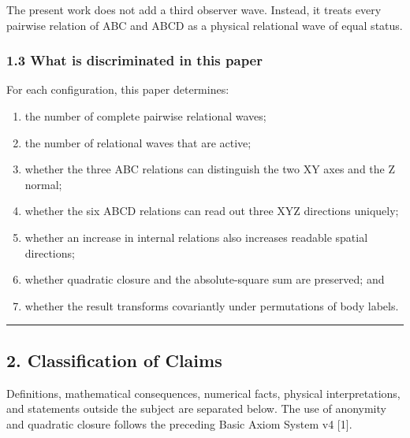 \documentclass[
  10pt,
  a4paper,
]{article}
\providecommand{\tightlist}{%
  \setlength{\itemsep}{0pt}\setlength{\parskip}{0pt}}
\begin{document}
The present work does not add a third observer wave. Instead, it treats
every pairwise relation of ABC and ABCD as a physical relational wave of
equal status.

\subsubsection{1.3 What is discriminated in this
paper}\label{what-is-discriminated-in-this-paper}

For each configuration, this paper determines:

\begin{enumerate}
\def\labelenumi{\arabic{enumi}.}
\tightlist
\item
  the number of complete pairwise relational waves;
\item
  the number of relational waves that are active;
\item
  whether the three ABC relations can distinguish the two XY axes and
  the Z normal;
\item
  whether the six ABCD relations can read out three XYZ directions
  uniquely;
\item
  whether an increase in internal relations also increases readable
  spatial directions;
\item
  whether quadratic closure and the absolute-square sum are preserved;
  and
\item
  whether the result transforms covariantly under permutations of body
  labels.
\end{enumerate}

\begin{center}\rule{0.5\linewidth}{0.5pt}\end{center}

\subsection{2. Classification of Claims}\label{classification-of-claims}

Definitions, mathematical consequences, numerical facts, physical
interpretations, and statements outside the subject are separated below.
The use of anonymity and quadratic closure follows the preceding Basic
Axiom System v4 {[}1{]}.
\end{document}
